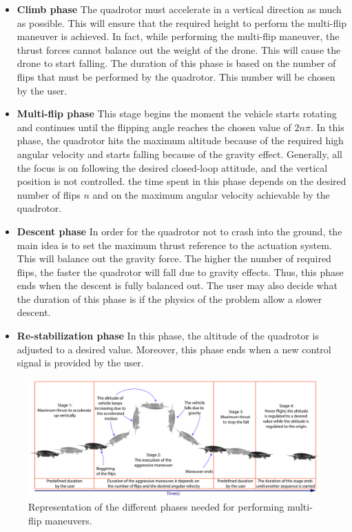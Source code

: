 \documentclass{thesisreport}
\begin{document}
\begin{itemize}
\setlength{\itemindent}{-.5in}
	\item [] \textbf{Climb phase} The quadrotor must accelerate in a vertical direction as much as possible. This will ensure that the required height to perform the multi-flip maneuver is achieved. In fact, while performing the multi-flip maneuver, the thrust forces cannot balance out the weight of the drone. This will cause the drone to start falling. The duration of this phase is based on the number of flips that must be performed by the quadrotor. This number will be chosen by the user.

	\item[] \textbf{Multi-flip phase} This stage begins the moment the vehicle starts rotating and continues until the flipping angle reaches the chosen value of $2n \pi$. In this phase, the quadrotor hits the maximum altitude because of the required high angular velocity and starts falling because of the gravity effect. Generally, all the focus is on following the desired closed-loop attitude, and the vertical position is not controlled. the time spent in this phase depends on the desired number of flips $n$ and on the maximum angular velocity achievable by the quadrotor.
	
	\item [] \textbf{Descent phase} In order for the quadrotor not to crash into the ground, the main idea is to set the maximum thrust reference to the actuation system. This will balance out the gravity force. The higher the number of required flips, the faster the quadrotor will fall due to gravity effects. Thus, this phase ends when the descent is fully balanced out. The user may also decide what the duration of this phase is if the physics of the problem allow a slower descent.
	\item [] \textbf{Re-stabilization phase} In this phase, the altitude of the quadrotor is adjusted to a desired value. Moreover, this phase ends when a new control signal is provided by the user. 
\end{itemize}

\begin{figure}[h]
\centering
\includegraphics[width=\textwidth]{Images/Flip/Physics}
\caption{Representation of the different phases needed for performing multi-flip maneuvers\cite{Castillo2018}.}
\label{flipping_physics}
\end{figure}
 
\end{document}
